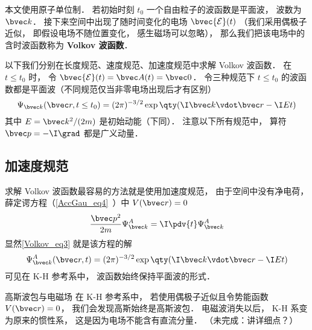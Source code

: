
\begin{issues}
\issueTODO
\end{issues}


本文使用原子单位制． 若初始时刻 $t_0$ 一个自由粒子的波函数是平面波， 波数为 $\bvec k$． 接下来空间中出现了随时间变化的电场 $\bvec {\mathcal E}(t)$ （我们采用偶极子近似， 即假设电场不随位置变化， 感生磁场可以忽略）， 那么我们把该电场中的含时波函数称为 \textbf{Volkov 波函数}．

以下我们分别在长度规范、速度规范、加速度规范中求解 Volkov 波函数． 在 $t \le t_0$ 时， 令 $\bvec {\mathcal E}(t) = \bvec A(t) = \bvec 0$． 令三种规范下 $t \le t_0$ 的波函数都是平面波（不同规范仅当非零电场出现后才有区别）
\begin{equation}\label{Volkov_eq3}
\Psi_{\bvec k}(\bvec r, t \le t_0) = (2\pi)^{-3/2} \exp\qty(\I\bvec k \vdot \bvec r - \I E t)
\end{equation}
其中 $E = \bvec k^2/(2m)$ 是初始动能（下同）． 注意以下所有规范中， 算符 $\bvec p = -\I \grad$ 都是广义动量．

\subsection{加速度规范}
求解 Volkov 波函数最容易的方法就是使用加速度规范， 由于空间中没有净电荷， 薛定谔方程（\autoref{AccGau_eq4}~）中 $V(\bvec r) = 0$
\begin{equation}
\frac{\bvec p^2}{2m}\Psi_{\bvec k}^A = \I \pdv{t} \Psi_{\bvec k}^A
\end{equation}
显然\autoref{Volkov_eq3} 就是该方程的解
\begin{equation}\label{Volkov_eq2}
\Psi_{\bvec k}^A(\bvec r, t) = (2\pi)^{-3/2} \exp\qty(\I\bvec k \vdot \bvec r - \I E t)
\end{equation}
可见在 K-H 参考系中， 波函数始终保持平面波的形式．

\begin{example}{高斯波包与电磁场}
在 K-H 参考系中， 若使用偶极子近似且令势能函数 $V(\bvec r) = 0$， 我们会发现高斯始终是高斯波包． 电磁波消失以后， K-H 系变为原来的惯性系， 这是因为电场不能含有直流分量． （未完成：讲详细点？）
\end{example}

